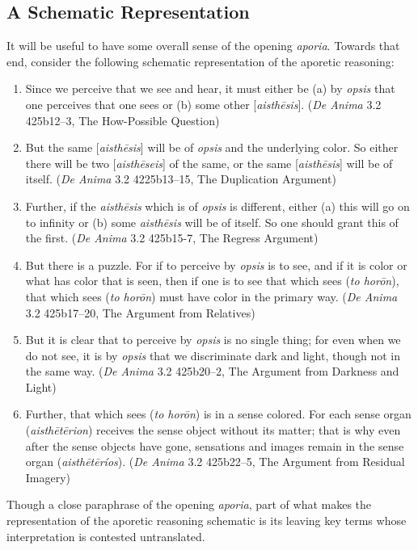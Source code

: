 \subsection{A Schematic Representation} %
\label{sub:a_schematic_representation}

It will be useful to have some overall sense of the opening \emph{aporia}. Towards that end, consider the following schematic representation of the aporetic reasoning:

\begin{enumerate}[(1)]
	\item Since we perceive that we see and hear, it must either be (a) by \emph{opsis} that one perceives that one sees or (b) some other [\emph{aisthēsis}]. (\emph{De Anima} 3.2 425b12–3, The How-Possible Question)
	\item But the same [\emph{aisthēsis}] will be of \emph{opsis} and the underlying color. So either there will be two [\emph{aisthēseis}] of the same, or the same [\emph{aisthēsis}] will be of itself. (\emph{De Anima} 3.2 4225b13–15, The Duplication Argument)
	\item Further, if the \emph{aisthēsis} which is of \emph{opsis} is different, either (a) this will go on to infinity or (b) some \emph{aisthēsis} will be of itself. So one should grant this of the first. (\emph{De Anima} 3.2 425b15-7, The Regress Argument)
	\item But there is a puzzle. For if to perceive by \emph{opsis} is to see, and if it is color or what has color that is seen, then if one is to see that which sees (\emph{to horōn}), that which sees (\emph{to horōn}) must have color in the primary way. (\emph{De Anima} 3.2 425b17–20, The Argument from Relatives)
	\item But it is clear that to perceive by \emph{opsis} is no single thing; for even when we do not see, it is by \emph{opsis} that we discriminate dark and light, though not in the same way. (\emph{De Anima} 3.2 425b20–2, The Argument from Darkness and Light)
	\item Further, that which sees (\emph{to horōn}) is in a sense colored. For each sense organ (\emph{aisthētērion}) receives the sense object without its matter; that is why even after the sense objects have gone, sensations and images remain in the sense organ (\emph{aisthētēríos}). (\emph{De Anima} 3.2 425b22–5, The Argument from Residual Imagery)
\end{enumerate} 

Though a close paraphrase of the opening \emph{aporia}, part of what makes the representation of the aporetic reasoning schematic is its leaving key terms whose interpretation is contested untranslated. 

